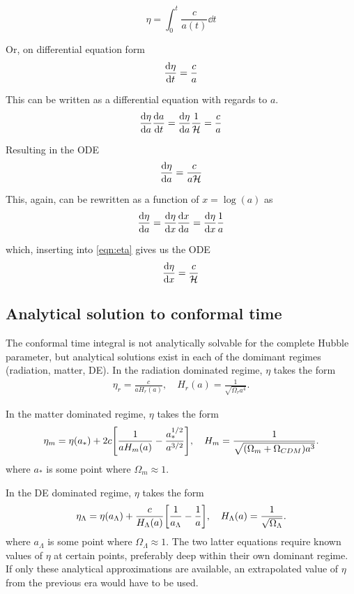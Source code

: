 \documentclass[10pt, a4paper]{article}
\begin{document}
\begin{equation}
    \eta = \int_0^t \frac{c}{a(t)} \dd{t}
\end{equation}

Or, on differential equation form
\begin{equation}
    \dv{\eta}{t} = \frac{c}{a}
\end{equation}

This can be written as a differential equation with regards to $a$.
\begin{equation*}
    \dv{\eta}{a}\dv{a}{t} = \dv{\eta}{a}\frac{1}{\mathcal{H}} = \frac{c}{a}
\end{equation*}

Resulting in the ODE
\begin{align}\label{eqn:eta}
    \dv{\eta}{a} = \frac{c}{a\mathcal{H}}
\end{align}

This, again, can be rewritten as a function of $x = \log(a)$ as
\begin{align*}
    \dv{\eta}{a} = \dv{\eta}{x}\dv{x}{a} = \dv{\eta}{x}\frac{1}{a}
\end{align*}

which, inserting into \ref{eqn:eta} gives us the ODE
\begin{align}\label{eqn:etaODE}
    \dv{\eta}{x} = \frac{c}{\mathcal{H}}
\end{align}


\subsection{Analytical solution to conformal time}\label{sec:conf}
The conformal time integral is not analytically solvable for the complete Hubble parameter, but analytical solutions exist in each of the domimant regimes (radiation, matter, DE). In the radiation dominated regime, $\eta$ takes the form
\begin{align}
    \eta_r = \frac{c}{aH_r(a)},  \quad  H_r(a) = \frac{1}{\sqrt{\Omega_r a^{4}}}.
\end{align}

In the matter dominated regime, $\eta$ takes the form
\begin{align}
    \eta_m = \eta(a_*) + 2c\qty[\frac{1}{aH_m(a)} - \frac{a_*^{1/2}}{a^{3/2}}], \quad H_m = \frac{1}{\sqrt{(\Omega_m + \Omega_{CDM}) a^3}}.
\end{align}
where $a_*$ is some point where $\Omega_m \approx 1$.

In the DE dominated regime, $\eta$ takes the form
\begin{align}
    \eta_\Lambda = \eta(a_\Lambda) + \frac{c}{H_\Lambda(a)}\qty[\frac{1}{a_\Lambda} - \frac{1}{a}], \quad H_\Lambda(a) = \frac{1}{\sqrt{\Omega_\Lambda}}.
\end{align}
where $a_\Lambda$ is some point where $\Omega_\Lambda \approx 1$. The two latter equations require known values of $\eta$ at certain points, preferably deep within their own dominant regime. If only these analytical approximations are available, an extrapolated value of $\eta$ from the previous era would have to be used.
\end{document}
